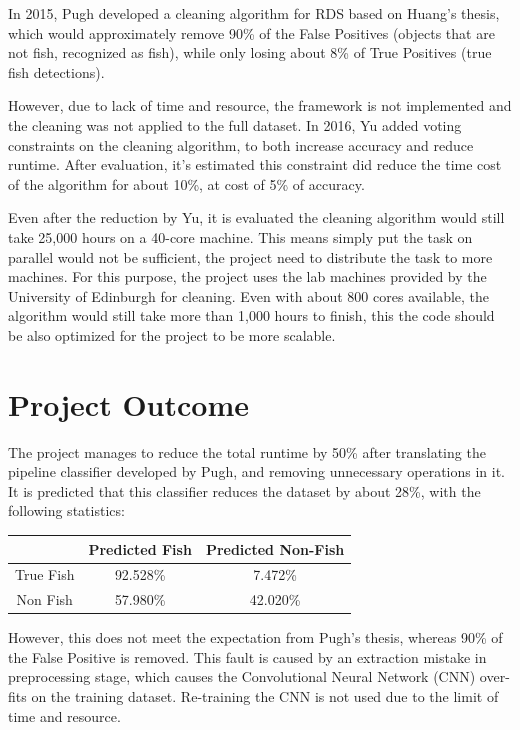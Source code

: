 \documentclass[bsc,logo,twoside,fullspacing,parskip]{infthesis}
\begin{document}
In 2015, Pugh\cite{Pugh} developed a cleaning algorithm for RDS based on Huang's thesis\cite{Huang}, which would approximately remove 90\% of the False Positives (objects that are not fish, recognized as fish), while only losing about 8\% of True Positives (true fish detections). 

However, due to lack of time and resource, the framework is not implemented and the cleaning was not applied to the full dataset.
In 2016, Yu\cite{Yu} added voting constraints on the cleaning algorithm, to both increase accuracy and reduce runtime. 
After evaluation, it's estimated this constraint did reduce the time cost of the algorithm for about 10\%, at cost of 5\% of accuracy.

Even after the reduction by Yu, it is evaluated the cleaning algorithm would still take 25,000 hours on a 40-core machine\cite{Yu}.
This means simply put the task on parallel would not be sufficient, the project need to distribute the task to more machines.
For this purpose, the project uses the lab machines provided by the University of Edinburgh for cleaning. 
Even with about 800 cores available, the algorithm would still take more than 1,000 hours to finish, this the code should be also optimized for the project to be more scalable.

\section{Project Outcome}

The project manages to reduce the total runtime by 50\% after translating the pipeline classifier developed by Pugh\cite{Pugh}, and removing unnecessary operations in it. 
It is predicted that this classifier reduces the dataset by about 28\%, with the following statistics:

\begin{center}
\begin{tabular}{ |c|c|c| }
\hline 
$ $ & Predicted Fish & Predicted Non-Fish \\
\hline 
True Fish & 92.528\% & 7.472\% \\
Non Fish & 57.980\% & 42.020\% \\
\hline 
\end{tabular}
\end{center}

However, this does not meet the expectation from Pugh's thesis, whereas 90\% of the False Positive is removed. 
This fault is caused by an extraction mistake in preprocessing stage, which causes the Convolutional Neural Network (CNN) over-fits on the training dataset. 
Re-training the CNN is not used due to the limit of time and resource.
\end{document}
